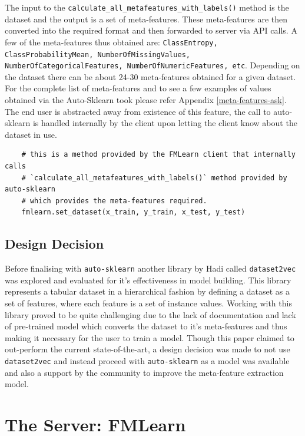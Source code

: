 The input to the \texttt{calculate\_all\_metafeatures\_with\_labels()} method is the dataset and the output is a set of meta-features. These meta-features are then converted into the required format and then forwarded to server via API calls. A few of the meta-features thus obtained are: \texttt{ClassEntropy, ClassProbabilityMean, NumberOfMissingValues, NumberOfCategoricalFeatures, NumberOfNumericFeatures, etc}. Depending on the dataset there can be about 24-30 meta-features obtained for a given dataset. For the complete list of meta-features and to see a few examples of values obtained via the Auto-Sklearn took please refer Appendix \ref{meta-features-ask}. The end user is abstracted away from existence of this feature, the call to auto-sklearn is handled internally by the client upon letting the client know about the dataset in use.

\begin{lstlisting}
    # this is a method provided by the FMLearn client that internally calls
    # `calculate_all_metafeatures_with_labels()` method provided by auto-sklearn
    # which provides the meta-features required.
    fmlearn.set_dataset(x_train, y_train, x_test, y_test)
\end{lstlisting}

\subsection*{Design Decision}

Before finalising with \texttt{auto-sklearn} another library by Hadi called \texttt{dataset2vec} \citep{dataset2vec} was explored and evaluated for it's effectiveness in model building. This library represents a tabular dataset in a hierarchical fashion by defining a dataset as a set of features, where each feature is a set of instance values. Working with this library proved to be quite challenging due to the lack of documentation and lack of pre-trained model which converts the dataset to it's meta-features and thus making it necessary for the user to train a model. Though this paper claimed to out-perform the current state-of-the-art, a design decision was made to not use \texttt{dataset2vec} and instead proceed with \texttt{auto-sklearn} as a model was available and also a support by the community to improve the meta-feature extraction model.

\section{The Server: FMLearn}
\label{fmlearn-server}

